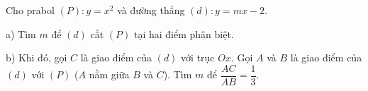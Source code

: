 \hienthidapan
\begin{bt}
	Cho prabol $(P)\colon y=x^2$ và đường thẳng $(d)\colon y=mx-2$.
	
	a) Tìm $m$ để $(d)$ cắt $(P)$ tại hai điểm phân biệt.
	
	b) Khi đó, gọi $C$ là giao điểm của $(d)$	với trục $Ox$. Gọi $A$ và $B$ là giao điểm của $(d)$ với $(P)$ ($A$ nằm giữa $B$ và $C$). Tìm $m$ để $\dfrac{AC}{AB}=\dfrac{1}{3}$.
\end{bt}




